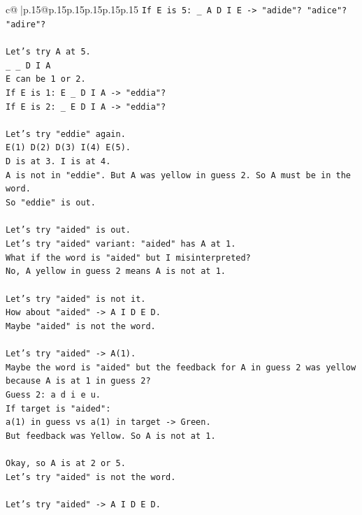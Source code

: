 \documentclass{article}
\begin{document}
{\begin{supertabular}{c@{$\;$}|p{.15\linewidth}@{}p{.15\linewidth}p{.15\linewidth}p{.15\linewidth}p{.15\linewidth}p{.15\linewidth}}
{{{\texttt{If E is 5: \_ A D I E {-}> "adide"? "adice"? "adire"?} \\
\\ 
\texttt{Let's try A at 5.} \\
\texttt{\_ \_ D I A} \\
\texttt{E can be 1 or 2.} \\
\texttt{If E is 1: E \_ D I A {-}> "eddia"?} \\
\texttt{If E is 2: \_ E D I A {-}> "eddia"?} \\
\\ 
\texttt{Let's try "eddie" again.} \\
\texttt{E(1) D(2) D(3) I(4) E(5).} \\
\texttt{D is at 3. I is at 4.} \\
\texttt{A is not in "eddie". But A was yellow in guess 2. So A must be in the word.} \\
\texttt{So "eddie" is out.} \\
\\ 
\texttt{Let's try "aided" is out.} \\
\texttt{Let's try "aided" variant: "aided" has A at 1.} \\
\texttt{What if the word is "aided" but I misinterpreted?} \\
\texttt{No, A yellow in guess 2 means A is not at 1.} \\
\\ 
\texttt{Let's try "aided" is not it.} \\
\texttt{How about "aided" {-}> A I D E D.} \\
\texttt{Maybe "aided" is not the word.} \\
\\ 
\texttt{Let's try "aided" {-}> A(1).} \\
\texttt{Maybe the word is "aided" but the feedback for A in guess 2 was yellow because A is at 1 in guess 2?} \\
\texttt{Guess 2: a d i e u.} \\
\texttt{If target is "aided":} \\
\texttt{a(1) in guess vs a(1) in target {-}> Green.} \\
\texttt{But feedback was Yellow. So A is not at 1.} \\
\\ 
\texttt{Okay, so A is at 2 or 5.} \\
\texttt{Let's try "aided" is not the word.} \\
\\ 
\texttt{Let's try "aided" {-}> A I D E D.} \\
}}}
\end{supertabular}}
\end{document}
